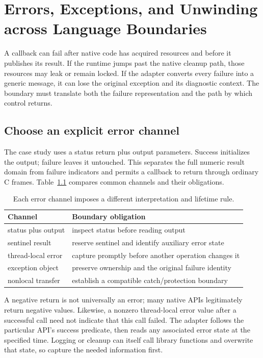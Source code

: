\chapter{Errors, Exceptions, and Unwinding across Language Boundaries}
\label{ch:ffi-errors}

A callback can fail after native code has acquired resources and before it publishes its result.
If the runtime jumps past the native cleanup path, those resources may leak or remain locked.
If the adapter converts every failure into a generic message, it can lose the original exception and its diagnostic context.
The boundary must translate both the failure representation and the path by which control returns.

\section{Choose an explicit error channel}
\label{sec:ch74-channels}
The case study uses a status return plus output parameters.
Success initializes the output; failure leaves it untouched.
This separates the full numeric result domain from failure indicators and permits a callback to return through ordinary C frames.
Table~\ref{tab:ch74-channels} compares common channels and their obligations.

\begin{table}[htbp]
\caption{Each error channel imposes a different interpretation and lifetime rule.}
\label{tab:ch74-channels}
\centering
\begin{tabular}{ll}
\toprule
Channel & Boundary obligation \\
\midrule
status plus output & inspect status before reading output \\
sentinel result & reserve sentinel and identify auxiliary error state \\
thread-local error & capture promptly before another operation changes it \\
exception object & preserve ownership and the original failure identity \\
nonlocal transfer & establish a compatible catch/protection boundary \\
\bottomrule
\end{tabular}
\end{table}

A negative return is not universally an error; many native APIs legitimately return negative values.
Likewise, a nonzero thread-local error value after a successful call need not indicate that this call failed.
The adapter follows the particular API's success predicate, then reads any associated error state at the specified time.
Logging or cleanup can itself call library functions and overwrite that state, so capture the needed information first.

